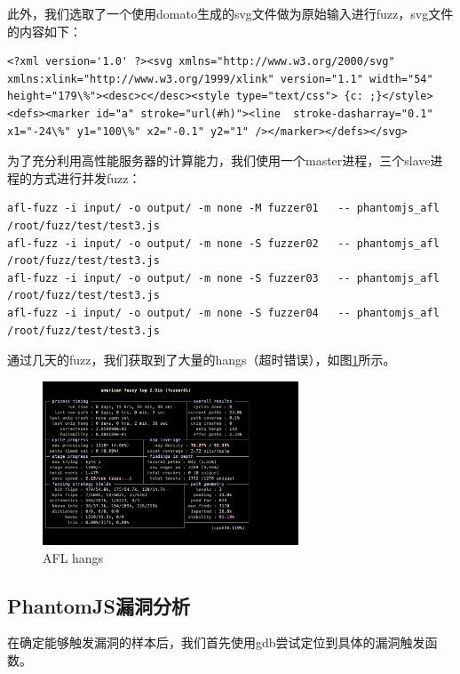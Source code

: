 \documentclass[doctor,privacy,twoside]{buaa_mac}
\begin{document}
此外，我们选取了一个使用domato生成的svg文件做为原始输入进行fuzz，svg文件的内容如下：
\lstset{language=JavaScript}
\begin{lstlisting}
<?xml version='1.0' ?><svg xmlns="http://www.w3.org/2000/svg" xmlns:xlink="http://www.w3.org/1999/xlink" version="1.1" width="54" height="179\%"><desc>c</desc><style type="text/css"> {c: ;}</style><defs><marker id="a" stroke="url(#h)"><line  stroke-dasharray="0.1" x1="-24\%" y1="100\%" x2="-0.1" y2="1" /></marker></defs></svg>
\end{lstlisting}

为了充分利用高性能服务器的计算能力，我们使用一个master进程，三个slave进程的方式进行并发fuzz：

\lstset{language=JavaScript}
\begin{lstlisting}
afl-fuzz -i input/ -o output/ -m none -M fuzzer01   -- phantomjs_afl /root/fuzz/test/test3.js
afl-fuzz -i input/ -o output/ -m none -S fuzzer02   -- phantomjs_afl /root/fuzz/test/test3.js
afl-fuzz -i input/ -o output/ -m none -S fuzzer03   -- phantomjs_afl /root/fuzz/test/test3.js
afl-fuzz -i input/ -o output/ -m none -S fuzzer04   -- phantomjs_afl /root/fuzz/test/test3.js
\end{lstlisting}

通过几天的fuzz，我们获取到了大量的hangs（超时错误），如图\ref{fig:hangs}所示。

\centerline{}
\begin{figure}[!h]
  \centering
  \includegraphics[width=0.68\textwidth]{images/afl_hangs.png}
  \caption{AFL hangs}
  \label{fig:hangs}
\end{figure}



\subsection{PhantomJS漏洞分析}

在确定能够触发漏洞的样本后，我们首先使用gdb尝试定位到具体的漏洞触发函数。
\end{document}
